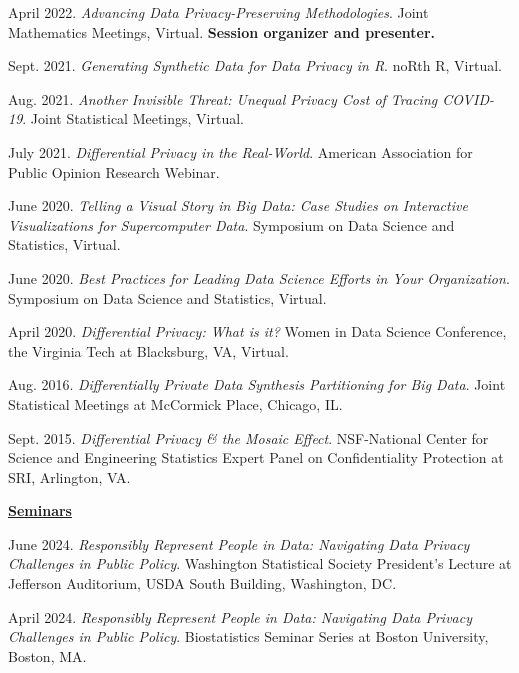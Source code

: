 \begin{etaremune}[topsep=0pt, itemsep=4pt, partopsep=0pt, parsep=0pt]
    \item April 2022. \textit{Advancing Data Privacy-Preserving Methodologies}. Joint Mathematics Meetings, Virtual. \textbf{Session organizer and presenter.}

    \item Sept. 2021. \textit{Generating Synthetic Data for Data Privacy in R}. noRth R, Virtual.

    \item Aug. 2021. \textit{Another Invisible Threat: Unequal Privacy Cost of Tracing COVID-19}. Joint Statistical Meetings, Virtual.
    
    \item July 2021. \textit{Differential Privacy in the Real-World}. American Association for Public Opinion Research Webinar.

    \item June 2020. \textit{Telling a Visual Story in Big Data: Case Studies on Interactive Visualizations for Supercomputer Data}. Symposium on Data Science and Statistics, Virtual.
  
    \item June 2020. \textit{Best Practices for Leading Data Science Efforts in Your Organization}. Symposium on Data Science and Statistics, Virtual.
  
    \item April 2020. \textit{Differential Privacy: What is it?} Women in Data Science Conference, the Virginia Tech at Blacksburg, VA, Virtual.

    \item Aug. 2016. \textit{Differentially Private Data Synthesis Partitioning for Big Data}. Joint Statistical Meetings at McCormick Place, Chicago, IL.
    
    \item Sept. 2015. \textit{Differential Privacy \& the Mosaic Effect}. NSF-National Center for Science and Engineering Statistics Expert Panel on Confidentiality Protection at SRI, Arlington, VA.

\vspace{6pt}
\hspace{-0.30in}\underline{\textbf{\large Seminars}}\normalsize  
    \item June 2024. \textit{Responsibly Represent People in Data: Navigating Data Privacy Challenges in Public Policy}. Washington Statistical Society President's Lecture at Jefferson Auditorium, USDA South Building, Washington, DC.

    \item April 2024. \textit{Responsibly Represent People in Data: Navigating Data Privacy Challenges in Public Policy}. Biostatistics Seminar Series at Boston University, Boston, MA.
    

\end{etaremune}
